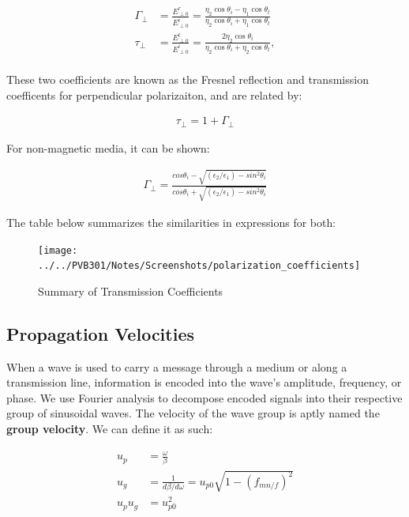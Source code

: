 \documentclass{book}
\begin{document}
\begin{align*}
	\Gamma_{\perp} &= \frac{E_{\perp 0}^r}{E_{\perp 0}^i} = \frac{\eta_2 \cos \theta_i - \eta_1 \cos \theta_t}{\eta_2 \cos \theta_i + \eta_1 \cos \theta_t}\\ 
	\tau_{\perp} &= \frac{E_{\perp 0}^t}{E_{\perp 0}^i} = \frac{2 \eta_2 \cos \theta_i}{\eta_2 \cos \theta_i + \eta_2 \cos \theta_t}, \\
\end{align*}

These two coefficients are known as the Fresnel reflection and transmission coefficents for perpendicular polarizaiton, and are related by:

\begin{align*}
	\tau_\perp = 1+\Gamma_\perp
\end{align*}

For non-magnetic media, it can be shown:

\begin{align*}
	\Gamma_\perp = \frac{cos\theta_i - \sqrt{(\epsilon_2 / \epsilon_1) - sin^2 \theta_i}}{cos\theta_i + \sqrt{(\epsilon_2/\epsilon_1)-sin^2\theta_i}}
\end{align*}

The table below summarizes the similarities in expressions for both:

\begin{figure}[h]
		\centering
		\texttt{[image: ../../PVB301/Notes/Screenshots/polarization\_coefficients]}
		\caption{Summary of Transmission Coefficients}
		\label{fig:polarizationcoefficients}
\end{figure}

\subsection{Propagation Velocities}

When a wave is used to carry a message through a medium or along a transmission line, information is encoded into the wave's amplitude, frequency, or phase. We use Fourier analysis to decompose encoded signals into their respective group of sinusoidal waves. The velocity of the wave group is aptly named the \textbf{group velocity}. We can define it as such:

\begin{align*}
	u_p &= \frac{\omega}{\beta} \\
	u_g &= \frac{1}{d\beta / d\omega} = u_{p0} \sqrt{1- (f_{mn/f})^2} \\
	u_p u_g &= u_{p0}^2
\end{align*}
\end{document}
